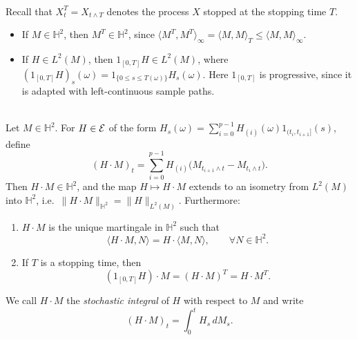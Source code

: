 \begin{remark} \label{chap5.1.1:remark-stopping}
\\
Recall that $X^T_t = X_{t \wedge T}$ denotes the process $X$ stopped at the stopping time $T$.
\begin{itemize}
    \item If $M \in \mathbb{H}^2$, then $M^T \in \mathbb{H}^2$, since $\langle M^T, M^T\rangle_\infty = \langle M,M\rangle_T \le \langle M,M\rangle_\infty$.
    \item If $H \in L^2(M)$, then $1_{[0,T]}H \in L^2(M)$, where $(1_{[0,T]}H)_s(\omega) = 1_{\{0 \le s \le T(\omega)\}}H_s(\omega)$. Here $1_{[0,T]}$ is progressive, since it is adapted with left-continuous sample paths.
\end{itemize}
\end{remark}

\begin{theorem} \label{chap5.1.1:theorem-stochastic_integral}
\\
Let $M \in \mathbb{H}^2$. For $H \in \mathcal{E}$ of the form $H_s(\omega)=\sum_{i=0}^{p-1}H_{(i)}(\omega)1_{(t_{i}, t_{i+1}]}(s)$, define
$$(H \cdot M)_t = \sum_{i=0}^{p-1} H_{(i)}\big(M_{t_{i+1}\wedge t} - M_{t_i \wedge t}\big).$$
Then $H \cdot M \in \mathbb{H}^2$, and the map $H \mapsto H \cdot M$ extends to an isometry from $L^2(M)$ into $\mathbb{H}^2$, i.e.\ $\|H \cdot M\|_{\mathbb{H}^2} = \|H\|_{L^2(M)}$. Furthermore:
\begin{enumerate}
    \item $H \cdot M$ is the unique martingale in $\mathbb{H}^2$ such that
    \begin{equation} \label{chap5.1.1:eq-bracket_commutes}
        \langle H \cdot M, N \rangle = H \cdot \langle M, N\rangle, \qquad \forall N \in \mathbb{H}^2.
    \end{equation}
    \item If $T$ is a stopping time, then
    \begin{equation} \label{chap5.1.1:eq-stopping}
        (1_{[0,T]}H) \cdot M = (H \cdot M)^T = H \cdot M^T.
    \end{equation}
\end{enumerate}
We call $H \cdot M$ the \textit{stochastic integral} of $H$ with respect to $M$ and write
$$(H \cdot M)_t = \int_0^t H_s \, dM_s.$$
\end{theorem}

